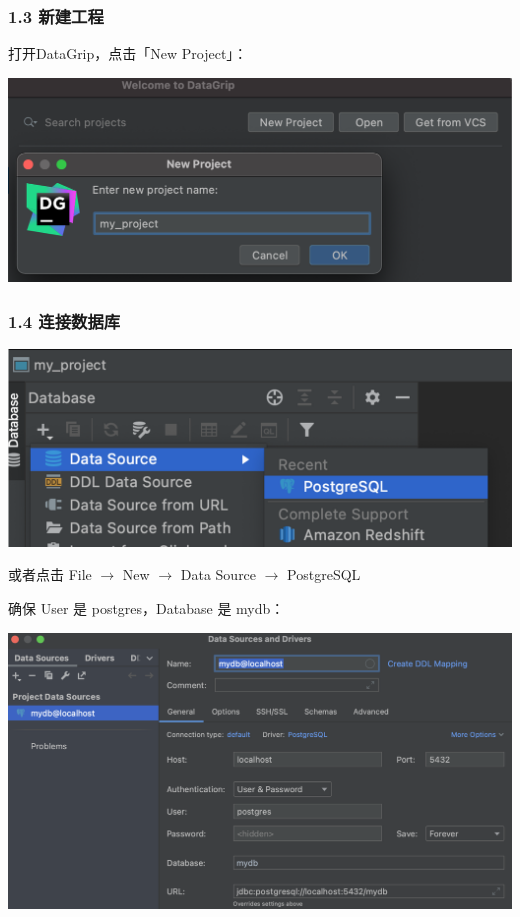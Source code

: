 \documentclass[aspectratio=169, 14pt]{beamer}
\begin{document}
\begin{frame}
	\frametitle{1.3 新建工程}
	打开DataGrip，点击「New Project」：

	\includegraphics[width=.8\textwidth]{week4/welcome}

\end{frame}

\begin{frame}
	\frametitle{1.4 连接数据库}
	\includegraphics[width=.8\textwidth]{week4/datasource}

	或者点击 File $\rightarrow$ New $\rightarrow$ Data Source $\rightarrow$ PostgreSQL

\end{frame}

\begin{frame}
	确保 User 是 \alert{postgres}，Database 是 \alert{mydb}：

	\includegraphics[width=.8\textwidth]{week4/config}

\end{frame}
\end{document}
